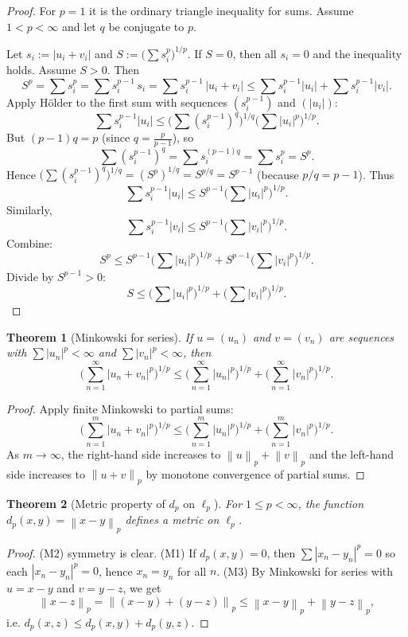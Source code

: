 \documentclass[11pt]{article}
\newtheorem{theorem}{Theorem}[section]
\theoremstyle{definition}
\newcommand{\norm}[1]{\left\lVert #1\right\rVert}
\begin{document}
\begin{proof}
For $p=1$ it is the ordinary triangle inequality for sums. Assume $1<p<\infty$ and let $q$ be conjugate to $p$.

Let $s_i:=|u_i+v_i|$ and $S:=\big(\sum s_i^p\big)^{1/p}$. If $S=0$, then all $s_i=0$ and the inequality holds.
Assume $S>0$. Then
\[
S^p=\sum s_i^p=\sum s_i^{p-1}\, s_i=\sum s_i^{p-1}\,|u_i+v_i|
\le \sum s_i^{p-1}|u_i|+\sum s_i^{p-1}|v_i|.
\]
Apply H\"older to the first sum with sequences $(s_i^{p-1})$ and $(|u_i|)$:
\[
\sum s_i^{p-1}|u_i|\le \Big(\sum (s_i^{p-1})^q\Big)^{1/q}\Big(\sum |u_i|^p\Big)^{1/p}.
\]
But $(p-1)q=p$ (since $q=\frac{p}{p-1}$), so
\[
\sum (s_i^{p-1})^q=\sum s_i^{(p-1)q}=\sum s_i^p=S^p.
\]
Hence $\big(\sum (s_i^{p-1})^q\big)^{1/q}=(S^p)^{1/q}=S^{p/q}=S^{p-1}$ (because $p/q=p-1$).
Thus
\[
\sum s_i^{p-1}|u_i|\le S^{p-1}\Big(\sum |u_i|^p\Big)^{1/p}.
\]
Similarly,
\[
\sum s_i^{p-1}|v_i|\le S^{p-1}\Big(\sum |v_i|^p\Big)^{1/p}.
\]
Combine:
\[
S^p\le S^{p-1}\Big(\sum |u_i|^p\Big)^{1/p}+S^{p-1}\Big(\sum |v_i|^p\Big)^{1/p}.
\]
Divide by $S^{p-1}>0$:
\[
S\le \Big(\sum |u_i|^p\Big)^{1/p}+\Big(\sum |v_i|^p\Big)^{1/p}.
\]
\end{proof}

\begin{theorem}[Minkowski for series]
If $u=(u_n)$ and $v=(v_n)$ are sequences with $\sum |u_n|^p<\infty$ and $\sum |v_n|^p<\infty$, then
\[
\Big(\sum_{n=1}^\infty |u_n+v_n|^p\Big)^{1/p}\le
\Big(\sum_{n=1}^\infty |u_n|^p\Big)^{1/p}+
\Big(\sum_{n=1}^\infty |v_n|^p\Big)^{1/p}.
\]
\end{theorem}

\begin{proof}
Apply finite Minkowski to partial sums:
\[
\Big(\sum_{n=1}^m |u_n+v_n|^p\Big)^{1/p}\le
\Big(\sum_{n=1}^m |u_n|^p\Big)^{1/p}+
\Big(\sum_{n=1}^m |v_n|^p\Big)^{1/p}.
\]
As $m\to\infty$, the right-hand side increases to $\norm{u}_p+\norm{v}_p$ and the left-hand side increases to $\norm{u+v}_p$ by monotone convergence of partial sums.
\end{proof}

\begin{theorem}[Metric property of $d_p$ on $\ell_p$]
For $1\le p<\infty$, the function $d_p(x,y)=\norm{x-y}_p$ defines a metric on $\ell_p$.
\end{theorem}

\begin{proof}
(M2) symmetry is clear. (M1) If $d_p(x,y)=0$, then $\sum |x_n-y_n|^p=0$ so each $|x_n-y_n|^p=0$, hence $x_n=y_n$ for all $n$.
(M3) By Minkowski for series with $u=x-y$ and $v=y-z$, we get
\[
\norm{x-z}_p=\norm{(x-y)+(y-z)}_p\le \norm{x-y}_p+\norm{y-z}_p,
\]
i.e. $d_p(x,z)\le d_p(x,y)+d_p(y,z)$.
\end{proof}
\end{document}
